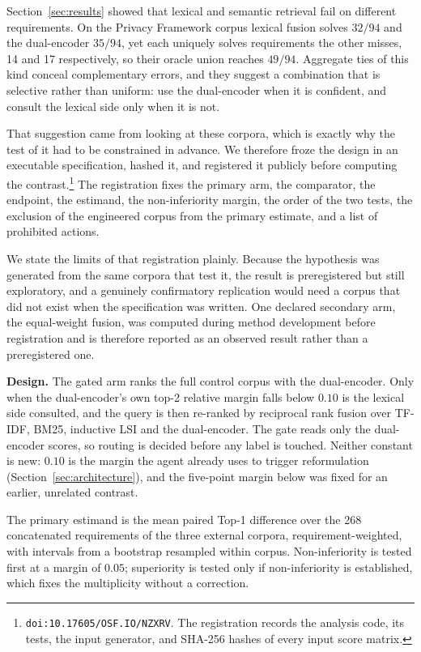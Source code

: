 \documentclass[smallextended,natbib]{svjour3}
\begin{document}
Section~\ref{sec:results} showed that lexical and semantic retrieval fail on different requirements. On the Privacy Framework corpus lexical fusion solves $32/94$ and the dual-encoder $35/94$, yet each uniquely solves requirements the other misses, 14 and 17 respectively, so their oracle union reaches $49/94$. Aggregate ties of this kind conceal complementary errors, and they suggest a combination that is selective rather than uniform: use the dual-encoder when it is confident, and consult the lexical side only when it is not.

That suggestion came from looking at these corpora, which is exactly why the test of it had to be constrained in advance. We therefore froze the design in an executable specification, hashed it, and registered it publicly before computing the contrast.\footnote{\texttt{doi:10.17605/OSF.IO/NZXRV}. The registration records the analysis code, its tests, the input generator, and SHA-256 hashes of every input score matrix.} The registration fixes the primary arm, the comparator, the endpoint, the estimand, the non-inferiority margin, the order of the two tests, the exclusion of the engineered corpus from the primary estimate, and a list of prohibited actions.

We state the limits of that registration plainly. Because the hypothesis was generated from the same corpora that test it, the result is preregistered but still exploratory, and a genuinely confirmatory replication would need a corpus that did not exist when the specification was written. One declared secondary arm, the equal-weight fusion, was computed during method development before registration and is therefore reported as an observed result rather than a preregistered one.

\noindent\textbf{Design.}
The gated arm ranks the full control corpus with the dual-encoder. Only when the dual-encoder's own top-2 relative margin falls below $0.10$ is the lexical side consulted, and the query is then re-ranked by reciprocal rank fusion over TF-IDF, BM25, inductive LSI and the dual-encoder. The gate reads only the dual-encoder scores, so routing is decided before any label is touched. Neither constant is new: $0.10$ is the margin the agent already uses to trigger reformulation (Section~\ref{sec:architecture}), and the five-point margin below was fixed for an earlier, unrelated contrast.

The primary estimand is the mean paired Top-1 difference over the 268 concatenated requirements of the three external corpora, requirement-weighted, with intervals from a bootstrap resampled within corpus. Non-inferiority is tested first at a margin of $0.05$; superiority is tested only if non-inferiority is established, which fixes the multiplicity without a correction.
\end{document}
